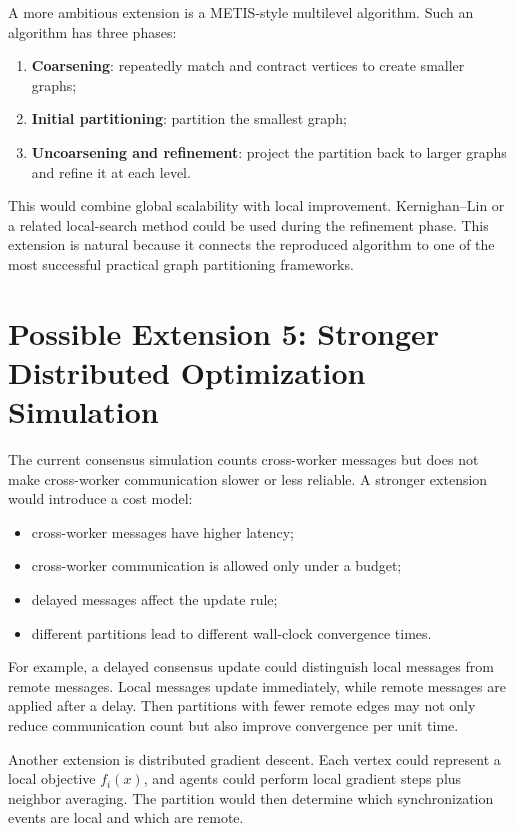 \documentclass[11pt]{article}
\begin{document}
A more ambitious extension is a METIS-style multilevel algorithm. Such an
algorithm has three phases:
\begin{enumerate}
    \item \textbf{Coarsening}: repeatedly match and contract vertices to create
    smaller graphs;
    \item \textbf{Initial partitioning}: partition the smallest graph;
    \item \textbf{Uncoarsening and refinement}: project the partition back to
    larger graphs and refine it at each level.
\end{enumerate}

This would combine global scalability with local improvement. Kernighan--Lin
or a related local-search method could be used during the refinement phase.
This extension is natural because it connects the reproduced algorithm to one
of the most successful practical graph partitioning frameworks.

\section{Possible Extension 5: Stronger Distributed Optimization Simulation}

The current consensus simulation counts cross-worker messages but does not
make cross-worker communication slower or less reliable. A stronger extension
would introduce a cost model:
\begin{itemize}
    \item cross-worker messages have higher latency;
    \item cross-worker communication is allowed only under a budget;
    \item delayed messages affect the update rule;
    \item different partitions lead to different wall-clock convergence times.
\end{itemize}

For example, a delayed consensus update could distinguish local messages from
remote messages. Local messages update immediately, while remote messages are
applied after a delay. Then partitions with fewer remote edges may not only
reduce communication count but also improve convergence per unit time.

Another extension is distributed gradient descent. Each vertex could represent
a local objective $f_i(x)$, and agents could perform local gradient steps plus
neighbor averaging. The partition would then determine which synchronization
events are local and which are remote.
\end{document}

